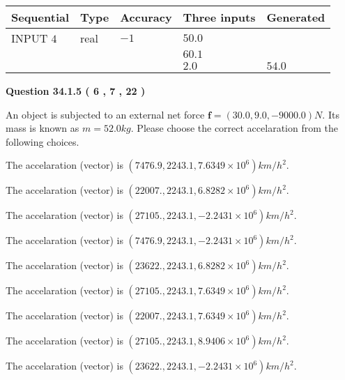\documentclass[12pt]{article}
\begin{document}
   
  
  
\noindent\begin{tabular}{|l|l|l|l|l|}
\hline
 Sequential & Type & Accuracy & Three inputs & Generated \\ 
\hline
 
 
  INPUT $            4 $ & real & $           -1  $ & $
 50.0
  $ & \\
  & & &  $
 60.1
  $ & \\
  & & &  $
 2.0
 $ & $ 54.0 $ 
 \\  \hline  
 \end{tabular}
   
   
  
\vspace{0.2in}
  
{\textbf{\Large{Question
34.1.5 
 (           6 ,           7 ,          22 )
}}}
  
  
 
An object is subjected to an external net force $\mathbf{f}=(
30.0 ,
9.0,
-9000.0  )N$. Its mass is known as
$m= %
52.0  kg$. Please choose the correct accelaration
from the following choices.
 
 
 
The accelaration (vector) is
$(
7476.9,
2243.1 ,
7.6349 \times 10^{6}
)km/h^2.
$
 
 
The accelaration (vector) is
$(
22007.,
2243.1 ,
6.8282 \times 10^{6}
)km/h^2.
$
 
 
The accelaration (vector) is
$(
27105.,
2243.1 ,
-2.2431 \times 10^{6}
)km/h^2.
$
 
 
The accelaration (vector) is
$(
7476.9,
2243.1 ,
-2.2431 \times 10^{6}
)km/h^2.
$
 
 
The accelaration (vector) is
$(
23622.,
2243.1 ,
6.8282 \times 10^{6}
)km/h^2.
$
 
 
The accelaration (vector) is
$(
27105.,
2243.1 ,
7.6349 \times 10^{6}
)km/h^2.
$
 
 
The accelaration (vector) is
$(
22007.,
2243.1 ,
7.6349 \times 10^{6}
)km/h^2.
$
 
 
The accelaration (vector) is
$(
27105.,
2243.1 ,
8.9406 \times 10^{6}
)km/h^2.
$
 
 
The accelaration (vector) is
$(
23622.,
2243.1 ,
-2.2431 \times 10^{6}
)km/h^2.
$
 
\end{document}
